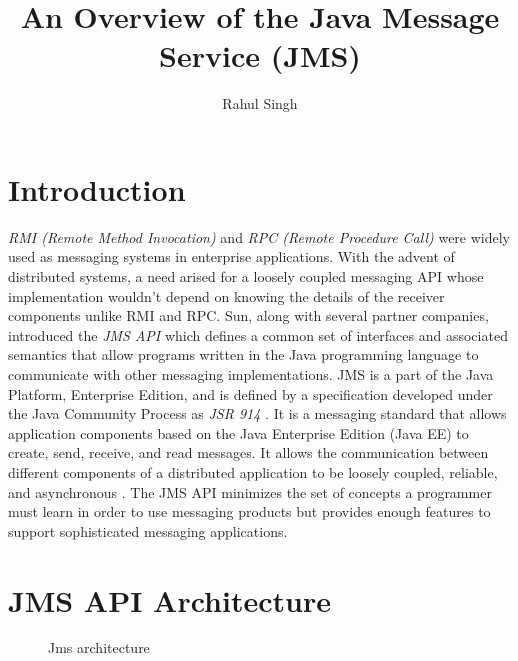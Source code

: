 \documentclass[9pt,twocolumn,twoside]{../../styles/osajnl}
\title{An Overview of the Java Message Service (JMS)}
\author[1]{Rahul Singh}
\affil[1]{School of Informatics and Computing, Bloomington, IN 47408, U.S.A.}
\affil[*]{Corresponding authors: rahpsing@iu.edu}
\begin{document}
\maketitle

\section{Introduction}

\emph{RMI (Remote Method Invocation)} \cite{www-rmi-wiki} and
\emph{RPC (Remote Procedure Call)} \cite{www-rpc-wiki} were widely
used as messaging systems in enterprise applications. With the advent
of distributed systems, a need arised for a loosely coupled messaging
API whose implementation wouldn't depend on knowing the details of the
receiver components unlike RMI and RPC. Sun, along with several partner
companies, introduced the \emph{JMS API} \cite{www-jms-wiki} which
defines a common set of interfaces and associated semantics that allow
programs written in the Java programming language to communicate with
other messaging implementations. JMS is a part of the Java Platform,
Enterprise Edition, and is defined by a specification developed under
the Java Community Process as \emph{JSR 914} \cite{www-jms-javajsr}.
It is a messaging standard that allows application components based on
the Java Enterprise Edition (Java EE) to create, send, receive, and
read messages. It allows the communication between different
components of a distributed application to be loosely coupled,
reliable, and asynchronous \cite{www-jms-oracle}. The JMS API
minimizes the set of concepts a programmer must learn in order to use
messaging products but provides enough features to support
sophisticated messaging applications.

\section{JMS API Architecture}

\begin{figure}[htbp]
\centering
{}
\caption{Jms architecture \cite{www-jms-tutorialoracle} }
\label{fig:JMS Objects}
\end{figure}
\end{document}
